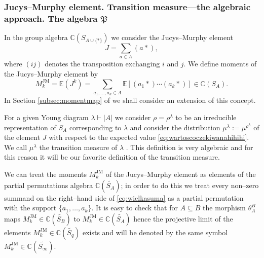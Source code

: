 \documentclass[12pt,dvips]{amsart}
\numberwithin{equation}{section} \numberwithin{figure}{section}
\theoremstyle{plain}
\theoremstyle{definition}
\theoremstyle{remark}
\newcommand{\E}{{\mathbb{E}}}
\newcommand{\C}{{\mathbb{C}}}
\newcommand{\R}{{\mathbb{R}}}
\newcommand{\N}{{\mathbb{N}}}
\newcommand{\Sn}[1]{{{S}}_{#1}}
\newcommand{\xtra}{\ast}
\newcommand{\MJM}{M^{\JM}}
\newcommand{\PartPerm}[1]{\widetilde{\Sn{#1}}}
\newcommand{\myalgebra}{\mathfrak{P}}
\DeclareMathOperator{\JM}{JM}
\begin{document}
\subsubsection{Jucys--Murphy element. Transition measure---the algebraic approach.
The algebra $\myalgebra$}  \label{subsec:transition1} In the group algebra
$\C(\Sn{A\cup\{\xtra\}})$ we consider the Jucys--Murphy element
 
$$ J= \sum_{a\in A} (a \xtra), $$
where $(i j)$ denotes the transposition exchanging $i$ and $j$. We
define moments of the Jucys--Murphy element by
\index{$MJM$@$\MJM_k$}
\begin{equation}
\MJM_k=\E(J^k)= \sum_{a_1,\dots,a_k\in A } \E[ (a_1 \xtra) \cdots
(a_k \xtra) ] \in \C(\Sn{A}). \label{eq:wielkasuma}
\end{equation}
In Section \ref{subsec:momentmap} of we shall consider an extension
of this concept.

For a given Young diagram $\lambda\vdash |A|$ we consider
$\rho=\rho^\lambda$ to be an irreducible representation of $\Sn{A}$
corresponding to $\lambda$ and consider the distribution
$\mu^{\lambda}:=\mu^{\rho^{\lambda}}$ of the element $J$ with
respect to the expected value \eqref{eq:wartoscoczekiwanahihihi}.
We call $\mu^{\lambda}$ the transition measure of $\lambda$
\cite{VershikKerov1995asymptoticbehavior,Kerov1993transition,
OkounkovVershik1996,Biane1998,Okounkov2000randompermutations}. This
definition is very algebraic and for this reason it will be our
favorite definition of the transition measure.



We can treat the moments $\MJM_k$ of the Jucys--Murphy element as
elements of the partial permutations algebra $\C(\PartPerm{A})$; in
order to do this we treat every non--zero summand on the right--hand
side of \eqref{eq:wielkasuma} as a partial permutation with the
support $\{a_1,\dots,a_k\}$. It is easy to check that for
$A\subseteq B$ the morphism $\theta^B_A$ maps
$\MJM_k\in\C(\PartPerm{B})$ to $\MJM_k\in\C(\PartPerm{A})$ hence the
projective limit of the elements $\MJM_k\in\C(\PartPerm{q})$ exists
and will be denoted by the same symbol
$\MJM_k\in\C(\PartPerm{\infty})$.
\end{document}
